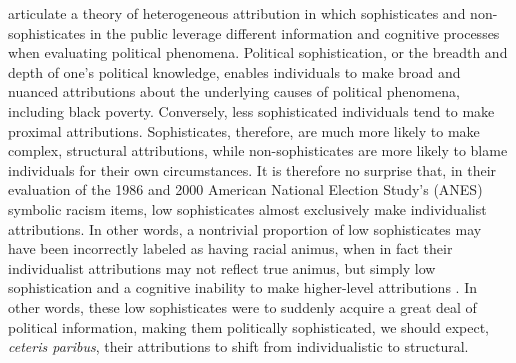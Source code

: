 \documentclass[12pt]{paper}
\begin{document}
\cite{gomez_political_2001, gomez_rethinking_2006} articulate a theory of heterogeneous attribution in which sophisticates and non-sophisticates in the public leverage different information and cognitive processes when evaluating political phenomena. Political sophistication, or the breadth and depth of one's political knowledge, enables individuals to make broad and nuanced attributions about the underlying causes of political phenomena, including black poverty. Conversely, less sophisticated individuals tend to make proximal attributions. Sophisticates, therefore, are much more likely to make complex, structural attributions, while non-sophisticates are more likely to blame individuals for their own circumstances. It is therefore no surprise that, in their evaluation of the 1986 and 2000 American National Election Study's (ANES) symbolic racism items, low sophisticates almost exclusively make individualist attributions. In other words, a nontrivial proportion of low sophisticates may have been incorrectly labeled as having racial animus, when in fact their individualist attributions may not reflect true animus, but simply low sophistication and a cognitive inability to make higher-level attributions \citep{gomez_rethinking_2006}. In other words, these low sophisticates were to suddenly acquire a great deal of political information, making them politically sophisticated, we should expect, \textit{ceteris paribus}, their attributions to shift from individualistic to structural.
\end{document}
